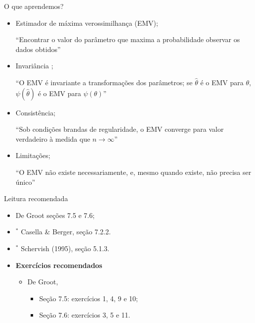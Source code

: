 \begin{frame}{O que aprendemos?}
\begin{itemize}
 \item[\faLightbulbO] Estimador de máxima verossimilhança (EMV);
 
   ``Encontrar o valor do parâmetro que maxima a probabilidade observar os dados obtidos''
   
  \item[\faLightbulbO] Invariância ;
  
  ``O EMV é invariante a transformações dos parâmetros; se $\hat{\theta}$ é o EMV para $\theta$, $\psi(\hat{\theta})$ é o EMV para $\psi(\theta)$''
  
    \item[\faLightbulbO] Consistência;
  
  ``Sob condições brandas de regularidade, o EMV converge para valor verdadeiro à medida que $n \to \infty$''
  
    \item[\faLightbulbO] Limitações;
  
  ``O EMV não existe necessariamente, e, mesmo quando existe, não precisa ser único''
  
  \end{itemize}
 \end{frame}

\begin{frame}{Leitura recomendada}
\begin{itemize}
 \item[\faBook] De Groot seções 7.5 e 7.6;
 \item[\faBook] $^\ast$ Casella \& Berger, seção 7.2.2.
 \item[\faBook] $^\ast$ Schervish (1995), seção 5.1.3.
 \item {\large\textbf{Exercícios recomendados}}
 \begin{itemize}
  \item[\faBookmark] De Groot,
  \begin{itemize}
   \item Seção 7.5: exercícios  1, 4, 9 e 10;
   \item Seção 7.6: exercícios 3, 5 e 11.
  \end{itemize}   
  \end{itemize}
 \end{itemize} 
\end{frame}

